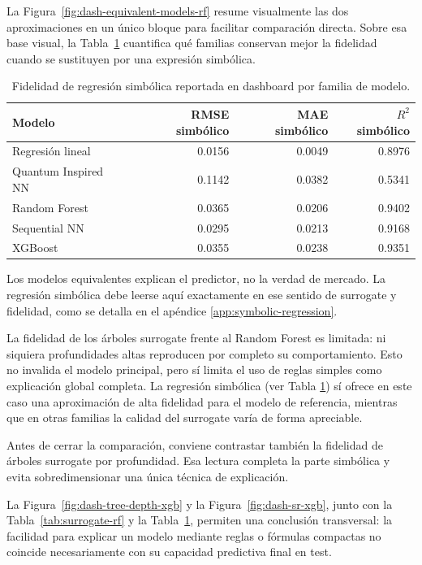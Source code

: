 La Figura~\ref{fig:dash-equivalent-models-rf} resume visualmente las dos aproximaciones en un único bloque para facilitar comparación directa. Sobre esa base visual, la Tabla~\ref{tab:symbolic-fidelity-all-models} cuantifica qué familias conservan mejor la fidelidad cuando se sustituyen por una expresión simbólica.



\begin{table}[!htbp]
    \centering
    \small
    \begin{tabular}{lrrr}
    \toprule
    Modelo & RMSE simbólico & MAE simbólico & \(R^2\) simbólico \\
    \midrule
    Regresión lineal & 0.0156 & 0.0049 & 0.8976 \\
    Quantum Inspired NN & 0.1142 & 0.0382 & 0.5341 \\
    Random Forest & 0.0365 & 0.0206 & 0.9402 \\
    Sequential NN & 0.0295 & 0.0213 & 0.9168 \\
    XGBoost & 0.0355 & 0.0238 & 0.9351 \\
    \bottomrule
    \end{tabular}
    \caption{Fidelidad de regresión simbólica reportada en dashboard por familia de modelo.}
    \label{tab:symbolic-fidelity-all-models}
\end{table}

Los modelos equivalentes explican el predictor, no la verdad de mercado. La regresión simbólica debe leerse aquí exactamente en ese sentido de surrogate y fidelidad, como se detalla en el apéndice \ref{app:symbolic-regression}. 

La fidelidad de los árboles surrogate frente al Random Forest es limitada: ni siquiera profundidades altas reproducen por completo su comportamiento. Esto no invalida el modelo principal, pero sí limita el uso de reglas simples como explicación global completa. La regresión simbólica (ver Tabla \ref{tab:symbolic-fidelity-all-models}) sí ofrece en este caso una aproximación de alta fidelidad para el modelo de referencia, mientras que en otras familias la calidad del surrogate varía de forma apreciable.


Antes de cerrar la comparación, conviene contrastar también la fidelidad de árboles surrogate por profundidad. Esa lectura completa la parte simbólica y evita sobredimensionar una única técnica de explicación.

La Figura~\ref{fig:dash-tree-depth-xgb} y la Figura~\ref{fig:dash-sr-xgb}, junto con la Tabla~\ref{tab:surrogate-rf} y la Tabla~\ref{tab:symbolic-fidelity-all-models}, permiten una conclusión transversal: la facilidad para explicar un modelo mediante reglas o fórmulas compactas no coincide necesariamente con su capacidad predictiva final en test.



